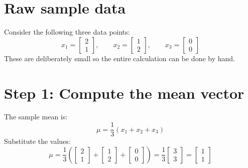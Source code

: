 \documentclass[11pt]{article}
\begin{document}
\section{Raw sample data}
Consider the following three data points:
\[
  x_1 =
  \begin{bmatrix}
    2\\1
  \end{bmatrix},
  \qquad
  x_2 =
  \begin{bmatrix}
    1\\2
  \end{bmatrix},
  \qquad
  x_3 =
  \begin{bmatrix}
    0\\0
  \end{bmatrix}
\]
These are deliberately small so the entire calculation can be done by hand.

\section{Step 1: Compute the mean vector}
The sample mean is:
\[
  \mu =
  \frac{1}{3}(x_1 + x_2 + x_3)
\]
Substitute the values:
\[
  \mu =
  \frac{1}{3}
  \left(
  \begin{bmatrix}
    2\\1
  \end{bmatrix}
  +
  \begin{bmatrix}
    1\\2
  \end{bmatrix}
  +
  \begin{bmatrix}
    0\\0
  \end{bmatrix}
  \right)
  =
  \frac{1}{3}
  \begin{bmatrix}
    3\\3
  \end{bmatrix}
  =
  \begin{bmatrix}
    1\\1
  \end{bmatrix}
\]
\end{document}
